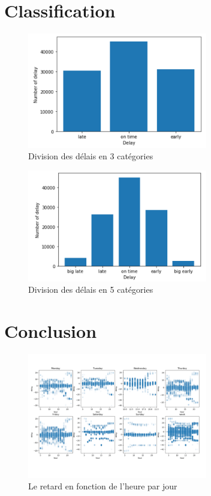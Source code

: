 \begin{appendices}
    \chapter{Classification}
    \begin{figure}[ht]
        \centering
        \includegraphics[width=0.7\textwidth]{images/3.png}
        \caption{Division des délais en 3 catégories}
        \label{appendix:3}
    \end{figure}

    \begin{figure}[ht]
        \centering
        \includegraphics[width=0.7\textwidth]{images/5.png}
        \caption{Division des délais en 5 catégories}
        \label{appendix:5}
    \end{figure}

    \chapter{Conclusion}
    \begin{figure}[ht]
        \centering
        \includegraphics[width=0.7\textwidth]{images/delay_day.png}
        \caption{Le retard en fonction de l'heure par jour}
        \label{appendix:delay_day}
    \end{figure}


\end{appendices}
